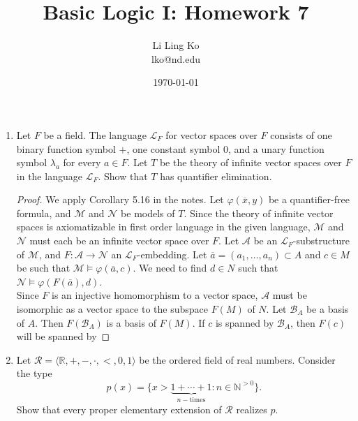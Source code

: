 \documentclass{article}
\begin{document}
\title{Basic Logic I: Homework 7}
\author{Li Ling Ko\\ lko@nd.edu}
\date{\today}
\maketitle

\begin{enumerate}[label={\bf Q\arabic*:}]
  \item Let $F$ be a field. The language $\mathcal{L}_F$ for vector spaces
    over $F$ consists of one binary function symbol $+$, one constant
    symbol $0$, and a unary function symbol $\lambda_a$ for every $a\in F$.
    Let $T$ be the theory of infinite vector spaces over $F$ in the
    language $\mathcal{L}_F$. Show that $T$ has quantifier elimination.

    \begin{proof}
      We apply Corollary 5.16 in the notes.  Let $\varphi(\overline{x},y)$
      be a quantifier-free formula, and $\mathcal{M}$ and $\mathcal{N}$ be
      models of $T$. Since the theory of infinite vector spaces is
      axiomatizable in first order language in the given language,
      $\mathcal{M}$ and $\mathcal{N}$ must each be an infinite vector space
      over $F$. Let $\mathcal{A}$ be an $\mathcal{L}_F$-substructure of
      $\mathcal{M}$, and $F:\mathcal{A}\rightarrow\mathcal{N}$ an
      $\mathcal{L}_F$-embedding. Let $\overline{a}=(a_1,\ldots,a_n)\subset
      A$ and $c\in M$ be such that
      $\mathcal{M}\models\varphi(\overline{a},c)$. We need to find $d\in N$
      such that $\mathcal{N}\models\varphi(F(\overline{a}),d)$. \\

      Since $F$ is an injective homomorphism to a vector space,
      $\mathcal{A}$ must be isomorphic as a vector space to the subspace
      $F(M)$ of $N$.
      Let $\mathcal{B}_A$ be a basis of $A$. Then
      $F(\mathcal{B}_A)$ is a basis of $F(M)$. If $c$ is spanned by
      $\mathcal{B}_A$, then $F(c)$ will be spanned by
    \end{proof}

  \item Let $\mathcal{R}=\langle\mathbb{R},+,-,\cdot,<,0,1\rangle$ be the
    ordered field of real numbers. Consider the type
    \begin{equation*}
      p(x) =
      \{x>\underbrace{1+\cdots+1}_{n-\text{times}}:n\in\mathbb{N}^{>0}\}.
    \end{equation*}
    Show that every proper elementary extension of $\mathcal{R}$ realizes
    $p$.


\end{enumerate}
\end{document}
